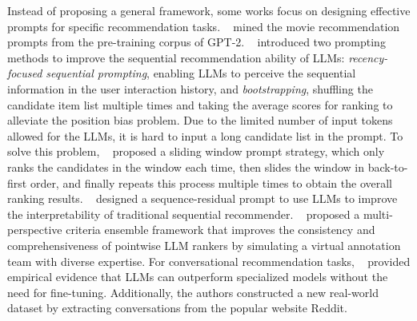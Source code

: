 \documentclass[sn-mathphys-num]{sn-jnl}%
\theoremstyle{thmstyleone}%
\theoremstyle{thmstyletwo}%
\theoremstyle{thmstylethree}%
\begin{document}
Instead of proposing a general framework, some works focus on designing effective prompts for specific recommendation tasks.
~\cite{DBLP:conf/ecir/SileoVR22} mined the movie recommendation prompts from the pre-training corpus of GPT-2.
~\cite{DBLP:journals/corr/abs-2305-08845} introduced two prompting methods to improve the sequential recommendation ability of LLMs: \textit{recency-focused sequential prompting}, enabling LLMs to perceive the sequential information in the user interaction history, and \textit{bootstrapping}, shuffling the candidate item list multiple times and taking the average scores for ranking to alleviate the position bias problem. 
Due to the limited number of input tokens allowed for the LLMs, it is hard to input a long candidate list in the prompt.
To solve this problem, ~\cite{DBLP:journals/corr/abs-2304-09542} proposed a sliding window prompt strategy, which only ranks the candidates in the window each time, then slides the window in back-to-first order, and finally repeats this process multiple times to obtain the overall ranking results.
~\cite{DBLP:journals/corr/abs-2310-20487} designed a sequence-residual prompt to use LLMs to improve the interpretability of traditional sequential recommender.
~\cite{DBLP:journals/corr/abs-2404-11960} proposed a multi-perspective criteria ensemble framework that improves the consistency and comprehensiveness of pointwise LLM rankers by simulating a virtual annotation team with diverse expertise.
For conversational recommendation tasks, ~\cite{DBLP:conf/cikm/HeXJSLFMKM23} provided empirical evidence that LLMs can outperform specialized models without the need for fine-tuning. Additionally, the authors constructed a new real-world dataset by extracting conversations from the popular website Reddit.
\end{document}

